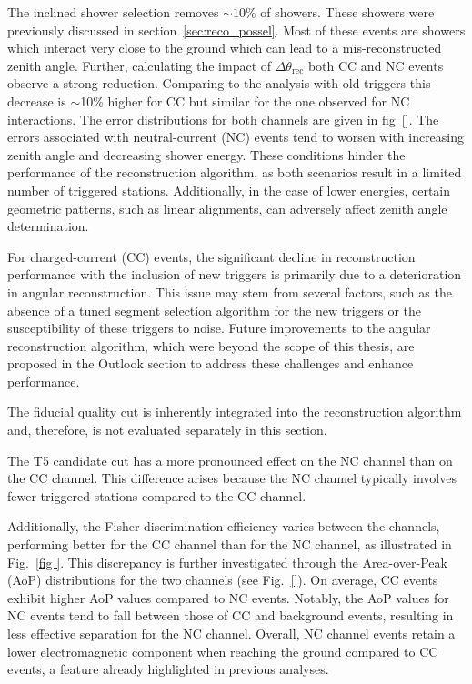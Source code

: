 The inclined shower selection removes $\sim 10\%$ of showers. These showers were previously discussed in section~\ref{sec:reco_possel}. Most of these events are showers which interact very close to the ground which can lead to a mis-reconstructed zenith angle. Further, calculating the impact of $\Delta \theta_{\text{rec}}$ both CC and NC events observe a strong reduction. Comparing to the analysis with old triggers this decrease is $\sim$10\% higher for CC but similar for the one observed for NC interactions. 
The error distributions for both channels are given in fig~\ref{}. 
The errors associated with neutral-current (NC) events tend to worsen with increasing zenith angle and decreasing shower energy. These conditions hinder the performance of the reconstruction algorithm, as both scenarios result in a limited number of triggered stations. Additionally, in the case of lower energies, certain geometric patterns, such as linear alignments, can adversely affect zenith angle determination.

For charged-current (CC) events, the significant decline in reconstruction performance with the inclusion of new triggers is primarily due to a deterioration in angular reconstruction. This issue may stem from several factors, such as the absence of a tuned segment selection algorithm for the new triggers or the susceptibility of these triggers to noise. Future improvements to the angular reconstruction algorithm, which were beyond the scope of this thesis, are proposed in the Outlook section to address these challenges and enhance performance.

The fiducial quality cut is inherently integrated into the reconstruction algorithm and, therefore, is not evaluated separately in this section.

The T5 candidate cut has a more pronounced effect on the NC channel than on the CC channel. This difference arises because the NC channel typically involves fewer triggered stations compared to the CC channel.

Additionally, the Fisher discrimination efficiency varies between the channels, performing better for the CC channel than for the NC channel, as illustrated in Fig.~\ref{fig
}. This discrepancy is further investigated through the Area-over-Peak (AoP) distributions for the two channels (see Fig.~\ref{}). On average, CC events exhibit higher AoP values compared to NC events. Notably, the AoP values for NC events tend to fall between those of CC and background events, resulting in less effective separation for the NC channel. Overall, NC channel events retain a lower electromagnetic component when reaching the ground compared to CC events, a feature already highlighted in previous analyses.

